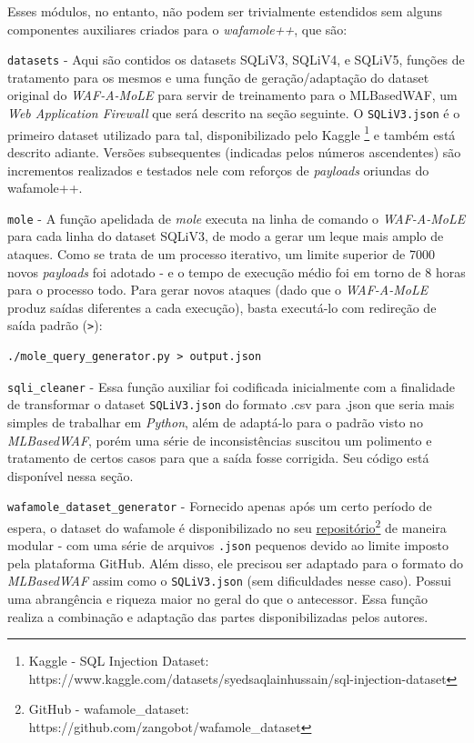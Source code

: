 Esses módulos, no entanto, não podem ser trivialmente estendidos sem alguns componentes auxiliares criados para o \textit{wafamole++}, que são:
\begin{alineas}
\item \verb+datasets+ - Aqui são contidos os datasets SQLiV3, SQLiV4, e SQLiV5, funções de tratamento para os mesmos e uma função de geração/adaptação do dataset original do \textit{WAF-A-MoLE} para servir de treinamento para o MLBasedWAF, um \textit{Web Application Firewall} que será descrito na seção seguinte. O \verb+SQLiV3.json+ é o primeiro dataset utilizado para tal, disponibilizado pelo Kaggle \footnote{Kaggle - SQL Injection Dataset: https://www.kaggle.com/datasets/syedsaqlainhussain/sql-injection-dataset} \cite{kaggle_dataset_sql} e também está descrito adiante. Versões subsequentes (indicadas pelos números ascendentes) são incrementos realizados e testados nele com reforços de \textit{payloads} oriundas do wafamole++.

\begin{alineas}
\item \verb+mole+ - A função apelidada de \textit{mole} executa na linha de comando o \textit{WAF-A-MoLE} para cada linha do dataset SQLiV3, de modo a gerar um leque mais amplo de ataques. Como se trata de um processo iterativo, um limite superior de 7000 novos \textit{payloads} foi adotado - e o tempo de execução médio foi em torno de 8 horas para o processo todo. Para gerar novos ataques (dado que o \textit{WAF-A-MoLE} produz saídas diferentes a cada execução), basta executá-lo com redireção de saída padrão (\verb+>+):
\begin{verbatim}
./mole_query_generator.py > output.json
\end{verbatim}

\item \verb+sqli_cleaner+ - Essa função auxiliar foi codificada inicialmente com a finalidade de transformar o dataset \verb+SQLiV3.json+ do formato .csv para .json que seria mais simples de trabalhar em \textit{Python}, além de adaptá-lo para o padrão visto no \textit{MLBasedWAF}, porém uma série de inconsistências suscitou um polimento e tratamento de certos casos para que a saída fosse corrigida. Seu código está disponível nessa seção.

\item \verb+wafamole_dataset_generator+ - Fornecido apenas após um certo período de espera, o dataset do wafamole é disponibilizado no seu \href{https://github.com/zangobot/wafamole_dataset}{repositório}\footnote{GitHub - wafamole\_dataset: https://github.com/zangobot/wafamole_dataset} de maneira modular - com uma série de arquivos \verb+.json+ pequenos devido ao limite imposto pela plataforma GitHub. Além disso, ele precisou ser adaptado para o formato do \textit{MLBasedWAF} assim como o \verb+SQLiV3.json+ (sem dificuldades nesse caso). Possui uma abrangência e riqueza maior no geral do que o antecessor. Essa função realiza a combinação e adaptação das partes disponibilizadas pelos autores.


\end{alineas}
\end{alineas}
